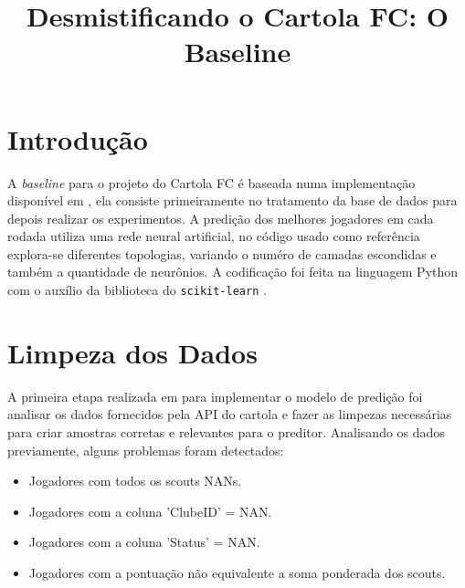 \documentclass[conference]{IEEEtran}
\newcommand{\ttt}[1]{{\texttt{#1}}}
\newcommand{\tit}[1]{{\textit{#1}}}
\begin{document}
\title{Desmistificando o Cartola FC: O Baseline}

\author
{
  \and
  \and
  \and
}

\maketitle

\section{Introdução}

A  \tit{baseline}  para  o  projeto  do Cartola  FC  é  baseada  numa
implementação  disponível   em  \cite{git_cartola},   ela  consiste
primeiramente no tratamento  da base de dados para  depois realizar os
experimentos.  A  predição dos  melhores  jogadores  em cada  rodada
utiliza uma rede neural artificial,  no código usado como referência
explora-se  diferentes  topologias,  variando  o  numéro  de  camadas
escondidas  e  também a  quantidade  de  neurônios. A  codificação
foi  feita  na  linguagem  Python  com o  auxílio  da  biblioteca  do
\ttt{scikit-learn} \cite{scikit-learn}.

\section{Limpeza dos Dados}

A primeira  etapa realizada  em \cite{git_cartola} para  implementar o
modelo  de predição  foi analisar  os dados  fornecidos pela  API do
cartola e fazer as limpezas  necessárias para criar amostras corretas
e relevantes para o preditor.  Analisando os dados previamente, alguns
problemas foram detectados:

\begin{itemize}
\item Jogadores com todos os scouts NANs.
\item Jogadores com a coluna 'ClubeID' = NAN.
\item Jogadores com a coluna 'Status' = NAN.
\item Jogadores com a pontuação não equivalente a soma ponderada dos scouts.
\end{itemize}
\end{document}
